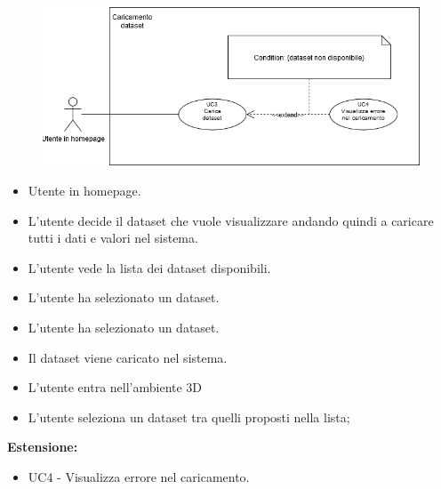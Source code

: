 \begin{figure}[h!]
    \centering
    \includegraphics[scale=0.6]{template/images/UC3.png}
    \caption{}
\end{figure}
    \UCdsc
    { %
        \begin{itemize}
            \item Utente in homepage.
        \end{itemize}
    }
    { %
        \begin{itemize}
            \item  L'utente decide il dataset che vuole visualizzare andando quindi a caricare tutti i dati e valori nel sistema.
        \end{itemize}
    }
    { %
        \begin{itemize}
            \item L'utente vede la lista dei dataset disponibili.
            \item L'utente ha selezionato un dataset.
        \end{itemize}
    }
    { %
        \begin{itemize}
            \item L'utente ha selezionato un dataset.
            \item Il dataset viene caricato nel sistema.
            \item L'utente entra nell'ambiente 3D
        \end{itemize}
    }
    { %
        \begin{itemize}
            \item L'utente seleziona un dataset tra quelli proposti nella lista;
        \end{itemize}
        \item \textbf{Estensione:} \begin{itemize}
            \item UC4 - Visualizza errore nel caricamento.
        \end{itemize}
    }


